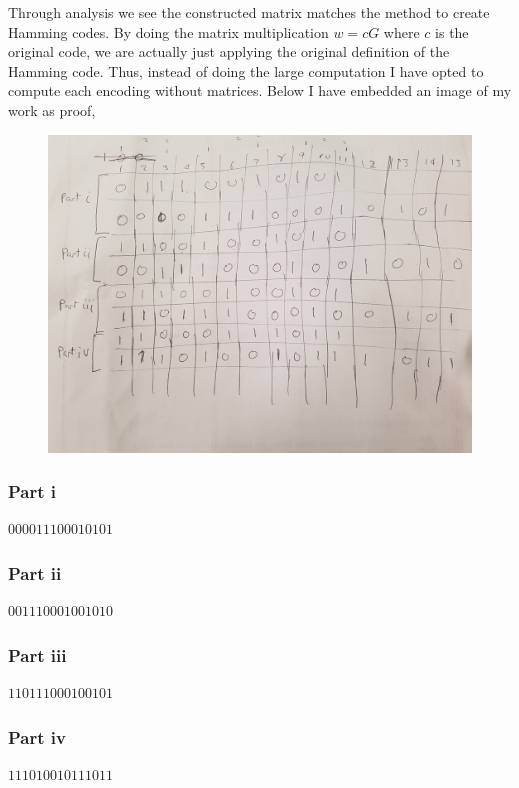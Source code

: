 \documentclass{article}
\begin{document}
Through analysis we see the constructed matrix matches the method to create
Hamming codes. By doing the matrix multiplication $w = cG$ where $c$ is the
original code, we are actually just applying the original definition of the
Hamming code. Thus, instead of doing the large computation I have opted to
compute each encoding without matrices. Below I have embedded an image of
my work as proof,
\begin{figure}[H]
    \centering
    \includegraphics[width=5in]{working.jpg}
\end{figure}

\subsubsection{Part i}
$000011100010101$

\subsubsection{Part ii}
$001110001001010$

\subsubsection{Part iii}
$110111000100101$

\subsubsection{Part iv}
$111010010111011$
\end{document}
